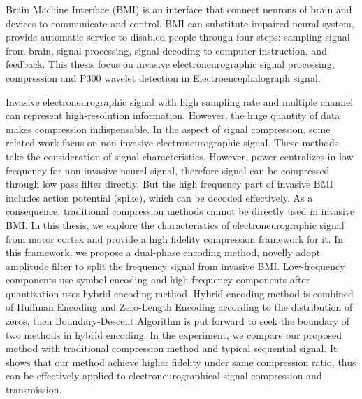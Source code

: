 \begin{englishabstract}
Brain Machine Interface (BMI) is an interface that connect neurons of brain and devices to communicate and control. BMI can substitute impaired neural system, provide automatic service to disabled people through four steps: sampling signal from brain, signal processing, signal decoding to computer instruction, and feedback. This thesis focus on invasive electroneurographic signal processing, compression and P300 wavelet detection in Electroencephalograph signal. 

Invasive electroneurographic signal with high sampling rate and multiple channel can represent high-resolution information. However, the huge quantity of data makes compression indispensable. 
In the aspect of signal compression, some related work focus on non-invasive electroneurographic signal. These methods take the consideration of signal characteristics. However, power centralizes in low frequency for non-invasive neural signal, therefore signal can be compressed through low pass filter directly. But the high frequency part of invasive BMI includes action potential (spike), which can be decoded effectively. As a consequence, traditional compression methods cannot be directly used in invasive BMI. In this thesis, we explore the characteristics of electroneurographic signal from motor cortex and provide a high fidelity compression framework for it. In this framework, we propose a dual-phase encoding method,  novelly adopt amplitude filter to split the frequency signal from invasive BMI. Low-frequency components use symbol encoding and high-frequency components after quantization uses hybrid encoding method. Hybrid encoding method is combined of Huffman Encoding and Zero-Length Encoding according to the distribution of zeros, then Boundary-Descent Algorithm is put forward to seek the boundary of two methods in hybrid encoding. In the experiment, we compare our proposed method with traditional compression method and typical sequential signal. It shows that our method achieve higher fidelity under same compression ratio, thus can be effectively applied to electroneurographical signal compression and transmission. 


\end{englishabstract}
